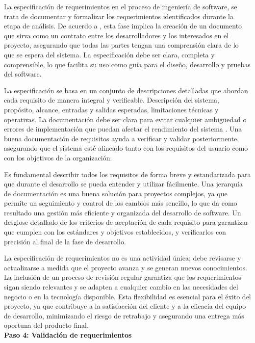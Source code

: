 		La especificación de requerimientos en el proceso de ingeniería de software, se trata de documentar y formalizar los requerimientos identificados durante la etapa de análisis. De acuerdo a \textcite{sommerville2011introduccion}, esta fase implica la creación de un documento que sirva como un contrato entre los desarrolladores y los interesados en el proyecto, asegurando que todas las partes tengan una comprensión clara de lo que se espera del sistema. La especificación debe ser clara, completa y comprensible, lo que facilita su uso como guía para el diseño, desarrollo y pruebas del software.
		
		La especificación se basa en un conjunto de descripciones detalladas que abordan cada requisito de manera integral y verificable. Descripción del sistema, propósito, alcance, entradas y salidas esperadas, limitaciones técnicas y operativas. La documentación debe ser clara para evitar cualquier ambigüedad o errores de implementación que puedan afectar el rendimiento del sistema \parencite{pressman2010ingenieria}. Una buena documentación de requisitos ayuda a verificar y validar posteriormente, asegurando que el sistema esté alineado tanto con los requisitos del usuario como con los objetivos de la organización. 

		Es fundamental describir todos los requisitos de forma breve y estandarizada para que durante el desarrollo se pueda entender y utilizar fácilmente. Una jerarquía de documentación es una buena solución para proyectos complejos, ya que permite un seguimiento y control de los cambios más sencillo, lo que da como resultado una gestión más eficiente y organizada del desarrollo de software. Un desglose detallado de los criterios de aceptación de cada requisito para garantizar que cumplen con los estándares y objetivos establecidos, y verificarlos con precisión al final de la fase de desarrollo.
		
		La especificación de requerimientos no es una actividad única; debe revisarse y actualizarse a medida que el proyecto avanza y se generan nuevos conocimientos. La inclusión de un proceso de revisión regular garantiza que los requerimientos sigan siendo relevantes y se adapten a cualquier cambio en las necesidades del negocio o en la tecnología disponible. Esta flexibilidad es esencial para el éxito del proyecto, ya que contribuye a la satisfacción del cliente y a la eficacia del equipo de desarrollo, minimizando el riesgo de retrabajo y asegurando una entrega más oportuna del producto final.\\
		\textbf{Paso 4: Validación de requerimientos}
		
